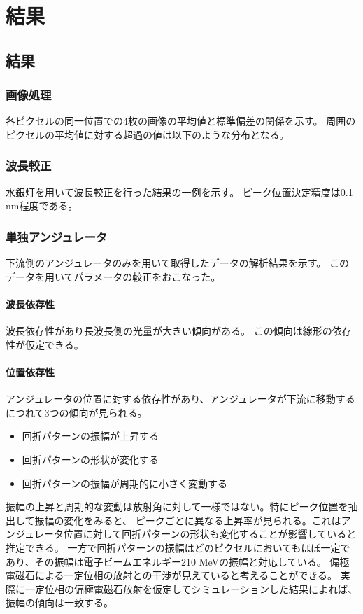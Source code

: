 \documentclass[a4paper,11pt,uplatex]{jsbook}
\begin{document}
\chapter{結果}
\section{結果}
\subsection{画像処理}
各ピクセルの同一位置での4枚の画像の平均値と標準偏差の関係を示す。
周囲のピクセルの平均値に対する超過の値は以下のような分布となる。
\subsection{波長較正}
水銀灯を用いて波長較正を行った結果の一例を示す。
ピーク位置決定精度は0.1 nm程度である。

\subsection{単独アンジュレータ}
下流側のアンジュレータのみを用いて取得したデータの解析結果を示す。
このデータを用いてパラメータの較正をおこなった。
\subsubsection{波長依存性}
波長依存性があり長波長側の光量が大きい傾向がある。
この傾向は線形の依存性が仮定できる。\\
\subsubsection{位置依存性}
アンジュレータの位置に対する依存性があり、アンジュレータが下流に移動するにつれて3つの傾向が見られる。
\begin{itemize}
  \item 回折パターンの振幅が上昇する
  \item 回折パターンの形状が変化する
  \item 回折パターンの振幅が周期的に小さく変動する
\end{itemize}
振幅の上昇と周期的な変動は放射角に対して一様ではない。特にピーク位置を抽出して振幅の変化をみると、
ピークごとに異なる上昇率が見られる。これはアンジュレータ位置に対して回折パターンの形状も変化することが影響していると推定できる。
一方で回折パターンの振幅はどのピクセルにおいてもほぼ一定であり、その振幅は電子ビームエネルギー210 MeVの振幅と対応している。
偏極電磁石による一定位相の放射との干渉が見えていると考えることができる。
実際に一定位相の偏極電磁石放射を仮定してシミュレーションした結果によれば、振幅の傾向は一致する。\\
\end{document}
